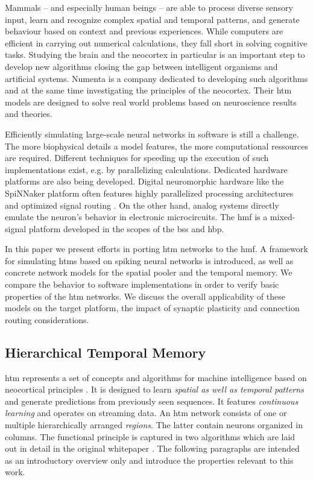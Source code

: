 Mammals -- and especially human beings -- are able to process diverse sensory input, learn and recognize complex spatial and temporal patterns, and generate behaviour based on context and previous experiences. While computers are efficient in carrying out numerical calculations, they fall short in solving cognitive tasks. Studying the brain and the neocortex in particular is an important step to develop new algorithms closing the gap between intelligent organisms and artificial systems. Numenta is a company dedicated to developing such algorithms and at the same time investigating the principles of the neocortex. Their \gls{htm} models are designed to solve real world problems based on neuroscience results and theories.

Efficiently simulating large-scale neural networks in software is still a challenge. The more biophysical details a model features, the more computational ressources are required. Different techniques for speeding up the execution of such implementations exist, e.g. by parallelizing calculations. Dedicated hardware platforms are also being developed. Digital neuromorphic hardware like the SpiNNaker platform often features highly parallelized processing architectures and optimized signal routing \citep{furber2014spinnaker}. On the other hand, analog systems directly emulate the neuron's behavior in electronic microcircuits. The \gls{hmf} is a mixed-signal platform developed in the scopes of the \gls{bss} and \gls{hbp}.

In this paper we present efforts in porting \gls{htm} networks to the \gls{hmf}.
A framework for simulating \glspl{htm} based on spiking neural networks is
introduced, as well as concrete network models for the spatial pooler and the
temporal memory. We compare the behavior to software
implementations in order to verify basic properties of the \gls{htm} networks.
We discuss the overall applicability of these models on the target platform,
the impact of synaptic plasticity and connection routing considerations.

\subsection{Hierarchical Temporal Memory}

\gls{htm} represents a set of concepts and algorithms for machine intelligence based on neocortical principles \citep{numenta2011htm}. It is designed to learn \emph{spatial as well as temporal patterns} and generate predictions from previously seen sequences. It features \emph{continuous learning} and operates on streaming data. An \gls{htm} network consists of one or multiple hierarchically arranged \emph{regions}. The latter contain neurons organized in columns. The functional principle is captured in two algorithms which are laid out in detail in the original whitepaper \citep{numenta2011htm}. The following paragraphs are intended as an introductory overview only and introduce the properties relevant to this work.

